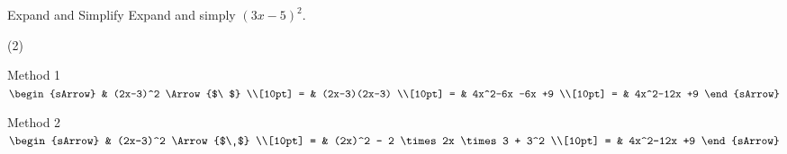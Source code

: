 \clearpage\noindent
{} 
\begin{boxA}[styleTitleLeft]{Expand and Simplify}       
    Expand and simply $(3x-5)^2$.
  \begin{mtask}(2)
      \task[] \begin{boxA}[styleDashedTitle,equal height group=A-RevA]{Method 1}
			       $\begin{sArrow}
			             & (2x-3)^2         \Arrow{$\ $} \\[10pt]
                       = & (2x-3)(2x-3)                  \\[10pt]      
					   = & 4x^2-6x -6x +9                \\[10pt]
					   = & 4x^2-12x +9
	                \end{sArrow}$
              \end{boxA}
      \task[]
              \begin{boxA}[styleDashedTitle,equal height group=A-RevA]{Method 2}
			       $\begin{sArrow}
			             & (2x-3)^2         \Arrow{$\ $}        \\[10pt]
                       = & (2x)^2 - 2 \times 2x \times 3 + 3^2  \\[10pt]      
					   = & 4x^2-12x +9
	                \end{sArrow}$
              \end{boxA}
   \end{mtask}
\end{boxA}

